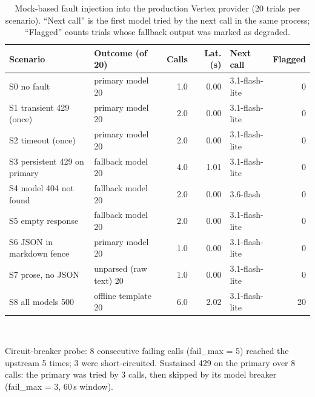 \begin{table}[t]
\centering
\caption{Mock-based fault injection into the production Vertex provider (20 trials per scenario). ``Next call'' is the first model tried by the next call in the same process; ``Flagged'' counts trials whose fallback output was marked as degraded.}
\label{tab:faults}
\footnotesize
\setlength{\tabcolsep}{3.5pt}
\begin{tabular}{llrrlr}
\toprule
Scenario & Outcome (of 20) & Calls & Lat. (s) & Next call & Flagged \\
\midrule
S0 no fault & primary model 20 & 1.0 & 0.00 & 3.1-flash-lite & 0 \\
S1 transient 429 (once) & primary model 20 & 2.0 & 0.00 & 3.1-flash-lite & 0 \\
S2 timeout (once) & primary model 20 & 2.0 & 0.00 & 3.1-flash-lite & 0 \\
S3 persistent 429 on primary & fallback model 20 & 4.0 & 1.01 & 3.1-flash-lite & 0 \\
S4 model 404 not found & fallback model 20 & 2.0 & 0.00 & 3.6-flash & 0 \\
S5 empty response & fallback model 20 & 2.0 & 0.00 & 3.1-flash-lite & 0 \\
S6 JSON in markdown fence & primary model 20 & 1.0 & 0.00 & 3.1-flash-lite & 0 \\
S7 prose, no JSON & unparsed (raw text) 20 & 1.0 & 0.00 & 3.1-flash-lite & 0 \\
S8 all models 500 & offline template 20 & 6.0 & 2.02 & 3.1-flash-lite & 20 \\
\bottomrule
\end{tabular}
\\[2pt]\parbox{\linewidth}{\scriptsize Circuit-breaker probe: 8 consecutive failing calls (fail\_max = 5) reached the upstream 5 times; 3 were short-circuited. Sustained 429 on the primary over 8 calls: the primary was tried by 3 calls, then skipped by its model breaker (fail\_max = 3, 60\,s window).}
\end{table}
